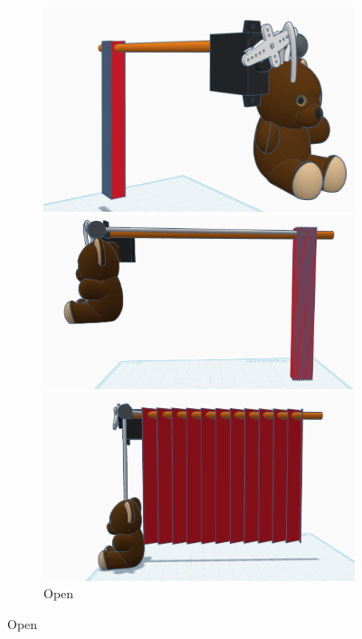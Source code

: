\documentclass[a4paper,12pt]{article}
\begin{document}
\begin{figure}
    \centering
    \begin{subfigure}[][][]{0.5\textwidth}
        \includegraphics[width=\linewidth]{figures/curtainModelOpenFront.png}
        \caption{Open}
        \includegraphics[width=\linewidth]{figures/curtainModelOpenSide.png}
        \caption{Open}
        \includegraphics[width=\linewidth]{figures/curtainModelClosedSide.png}

\end{subfigure}
\end{figure}
\end{document}
